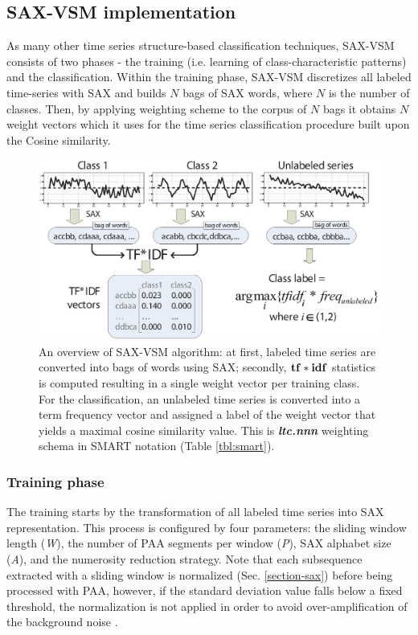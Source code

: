\subsection{SAX-VSM implementation} \label{sax-vsm}
As many other time series structure-based classification techniques, SAX-VSM consists of two 
phases - the training (i.e. learning of class-characteristic patterns) and the classification. 
Within the training phase, SAX-VSM discretizes all labeled time-series with SAX and builds $N$ bags 
of SAX words, where $N$ is the number of classes. 
Then, by applying \tfidf weighting scheme to the corpus of $N$ bags it obtains $N$ weight vectors 
which it uses for the time series classification procedure built upon the Cosine similarity.

\begin{figure}[t]
   \centering
   \includegraphics[width=148mm]{figures/SAX-VSM_overview.eps}
   \caption{
   An overview of SAX-VSM algorithm: 
   at first, labeled time series are converted into bags of words using SAX; 
   secondly, $\text{\textbf{tf}}\ast\text{\textbf{idf}}$ statistics is computed resulting in 
   a single weight vector per training class. For the classification, an unlabeled 
   time series is converted into a term frequency vector and assigned a 
   label of the weight vector that yields a maximal cosine similarity value.
   This is \textit{\textbf{ltc.nnn}} weighting schema in SMART notation (Table \ref{tbl:smart}).}
   \label{fig:sax-vsm_overview}
\end{figure}

\subsubsection{Training phase}
The training starts by the transformation of all labeled time series into SAX representation. 
This process is configured by four parameters: 
the sliding window length (\textit{W}), 
the number of PAA segments per window (\textit{P}), 
SAX alphabet size (\textit{A}),
and the numerosity reduction strategy.
Note that each subsequence extracted with a sliding window is normalized (Sec. \ref{section-sax}) 
before being processed with PAA, however, if the standard deviation value falls below a fixed threshold, 
the normalization is not applied in order to avoid over-amplification of the background noise \cite{sax}. 

